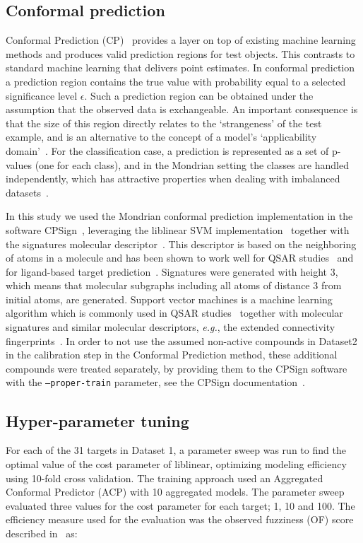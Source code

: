 \documentclass[utf8]{frontiersSCNS} %
\begin{document}
\subsection*{Conformal prediction}
Conformal Prediction (CP)~\cite{Vovk2005} provides a layer on top of
existing machine learning methods and produces valid prediction regions for test
objects. This contrasts to standard machine learning that delivers point
estimates. In conformal prediction a prediction region contains the true
value with probability equal to a selected significance level $\epsilon$. Such
a prediction region can be obtained under the assumption that the observed data
is exchangeable. An important consequence is that the size of this region directly
relates to the `strangeness' of the test example, and is an alternative to the
concept of a model's `applicability domain'~\cite{norinder2014introducing}. For
the classification case, a prediction is represented as a set of p-values (one for each
class), and in the Mondrian setting the classes are handled independently,
which has attractive properties when dealing with imbalanced
datasets~\cite{Norinder:2017qc,Sun:2017qm}.

In this study we used the Mondrian conformal prediction implementation in the
software CPSign~\cite{CPSignDocs}, leveraging the
liblinear SVM implementation~\cite{fan2008liblinear} together with the
signatures molecular descriptor~\cite{faulon2003signature}.  This descriptor is
based on the neighboring of atoms in a molecule and has been shown to work
well for QSAR studies~\cite{lapins2018confidence,Alvarsson:2016pw} and for
ligand-based target prediction~\cite{alvarsson2014ligand}. Signatures were
generated with height 3, which means that molecular subgraphs including all atoms
of distance 3 from initial atoms, are generated. Support vector
machines is a machine learning algorithm which is commonly used in QSAR
studies~\cite{norinder2003support,zhou2011qsar} together with molecular
signatures and similar molecular descriptors, \textit{e.g.}, the extended
connectivity fingerprints~\cite{rogers2010extended}.
In order to not use the assumed non-active compounds in Dataset2 in the
calibration step in the Conformal Prediction method, these additional compounds
were treated separately, by providing them to the CPSign software with the
\texttt{--proper-train} parameter, see the CPSign
documentation~\cite{CPSignDocs}.


\subsection*{Hyper-parameter tuning}
For each of the 31 targets in Dataset 1, a parameter sweep was run to find the optimal value
of the cost parameter of liblinear, optimizing modeling efficiency using
10-fold cross validation. The training approach used an Aggregated Conformal
Predictor (ACP) with 10 aggregated models.  The parameter sweep evaluated three
values for the cost parameter for each target; 1, 10 and 100. The efficiency
measure used for the evaluation was the observed fuzziness (OF) score described
in~\cite{Vovk2016} as:
\end{document}
